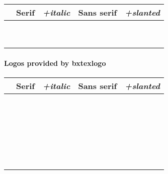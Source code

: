 \documentclass[a4paper]{article}
\newcommand{\Pkg}[1]{\textsf{#1}}
\newenvironment{LogoSamples}{%
  \begin{center}\begin{tabular}{ccccc}
    \hline \phantom{\LARGE I}
        & \textrm{Serif} & \textit{+italic}
        & \textsf{Sans serif} & \textsl{+slanted}
    \\\hline
}{%
    \hline
  \end{tabular}\end{center}
}
\newcommand*{\LSEntry}[1]{%
  \texttt{\string#1} & \textrm{#1} & \textit{#1}
      & \textsf{#1} & \textsf{\textsl{#1}}
  \\}
\begin{document}
\begin{LogoSamples}
\LSEntry{\HanTheThanh}
\LSEntry{\KOMAScript}
\LSEntry{\LaTeXTeX}
\LSEntry{\NTS}
\LSEntry{\PiCTeX}
\LSEntry{\SageTeX}
\LSEntry{\SLiTeX}
\LSEntry{\teTeX}
\LSEntry{\TTH}
\end{LogoSamples}

\paragraph{Logos provided by \Pkg{bxtexlogo}}\mbox{}

\begin{LogoSamples}
\LSEntry{\ApTeX}
\LSEntry{\CSTUG}
\LSEntry{\DVIPDFMx}
\LSEntry{\HeVeA}
\LSEntry{\JBibTeX}
\LSEntry{\JLaTeX}
\LSEntry{\JTeX}
\LSEntry{\KaTeX}
\LSEntry{\KET}
\LSEntry{\KETpic}
\LSEntry{\LaTeXiT}
\LSEntry{\LaTeXML}
\LSEntry{\logoAleph}
\LSEntry{\logoLambda}
\LSEntry{\logoLamed}
\LSEntry{\logoOmega}
\LSEntry{\OpTeX}
\LSEntry{\pTeXsT}
\LSEntry{\XyM}
\LSEntry{\XyMTeX}
\LSEntry{\BaSiX}
\LSEntry{\OneTeX}
\LSEntry{\SuyahTeX}
\LSEntry{\SATySFi}
\LSEntry{\TeXonLaTeX}
\end{LogoSamples}
\end{document}
